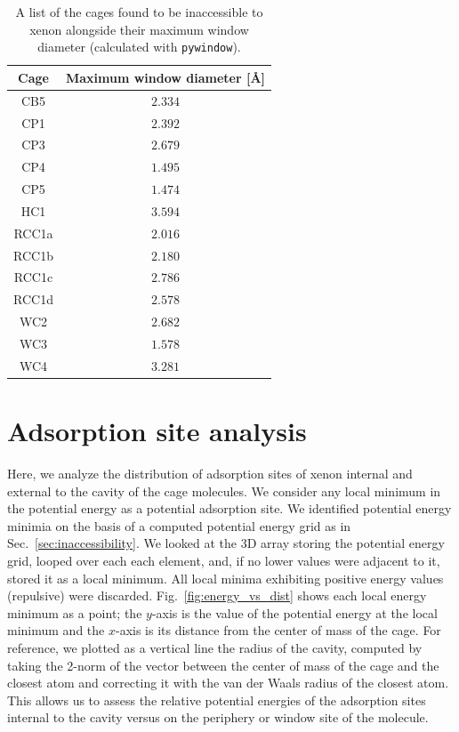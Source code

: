 \documentclass[journal=jacsat,manuscript=article]{achemso}
\begin{document}
{\begin{table}
  \caption{\color{red}A list of the cages found to be inaccessible to xenon alongside their maximum window diameter (calculated with \texttt{pywindow}).}
  \label{tbl:inaccessible}
  \begin{tabular}{cc}
    \hline
    \textbf{Cage}  & \textbf{Maximum window diameter [\AA]}  \\
    \hline
    CB5 & $2.334$ \\
    CP1 & $2.392$ \\
    CP3 & $2.679$ \\
    CP4 & $1.495$ \\
	CP5 & $1.474$ \\
    HC1 & $3.594$ \\
    RCC1a & $2.016$ \\
    RCC1b & $2.180$ \\
    RCC1c & $2.786$ \\
	RCC1d & $2.578$ \\
	WC2 & $2.682$ \\
	WC3 & $1.578$ \\
	WC4 & $3.281$ \\
    \hline
  \end{tabular}
\end{table}

\clearpage
\newpage


\section{\color{red}Adsorption site analysis}
Here, we analyze the distribution of adsorption sites of xenon internal and external to the cavity of the cage molecules. We consider any local minimum in the potential energy as a potential adsorption site. We identified potential energy minimia on the basis of a computed potential energy grid as in Sec.~\ref{sec:inaccessibility}. We looked at the 3D array storing the potential energy grid, looped over each each element, and, if no lower values were adjacent to it, stored it as a local minimum. All local minima exhibiting positive energy values (repulsive) were discarded. 
Fig.~\ref{fig:energy_vs_dist} shows each local energy minimum as a point; the $y$-axis is the value of the potential energy at the local minimum and the $x$-axis is its distance from the center of mass of the cage. For reference, we plotted as a vertical line the radius of the cavity, computed by taking the 2-norm of the vector between the center of mass of the cage and the closest atom and correcting it with the van der Waals radius of the closest atom. This allows us to assess the relative potential energies of the adsorption sites internal to the cavity versus on the periphery or window site of the molecule.}
\end{document}
